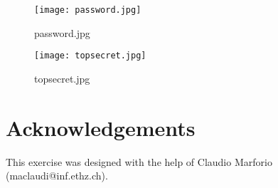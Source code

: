 \documentclass[a4paper,11pt]{article}
\begin{document}
\begin{figure} \center
  \texttt{[image: password.jpg]}
  \caption{password.jpg}
  \label{fig:password}
\end{figure}
\begin{figure} \center
  \texttt{[image: topsecret.jpg]}
  \caption{topsecret.jpg}
  \label{fig:topsecret}
\end{figure}

\section{Acknowledgements}
This exercise was designed with the help of Claudio Marforio
(maclaudi@inf.ethz.ch).
\end{document}
